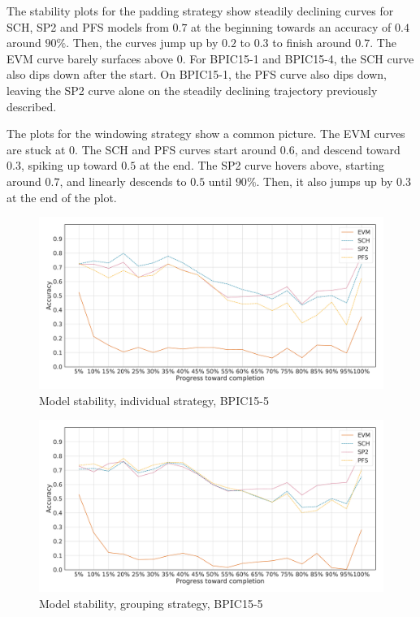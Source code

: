 The stability plots for the padding strategy show steadily declining curves for SCH, SP2 and PFS models from $0.7$ at the beginning towards an accuracy of $0.4$ around $90\%$.
Then, the curves jump up by $0.2$ to $0.3$ to finish around $0.7$.
The EVM curve barely surfaces above $0$.
For BPIC15-1 and BPIC15-4, the SCH curve also dips down after the start.
On BPIC15-1, the PFS curve also dips down, leaving the SP2 curve alone on the steadily declining trajectory previously described.

The plots for the windowing strategy show a common picture.
The EVM curves are stuck at 0.
The SCH and PFS curves start around $0.6$, and descend toward $0.3$, spiking up toward $0.5$ at the end.
The SP2 curve hovers above, starting around $0.7$, and linearly descends to $0.5$ until $90\%$.
Then, it also jumps up by $0.3$ at the end of the plot.

\begin{figure}[!htb]
    \centering
    \includegraphics[width=\textwidth]{gfx/bpic2015_5/individual_stability.pdf}
    \caption{Model stability, individual strategy, BPIC15-5}
    \label{fig:bpic15-5-individual-stability}
\end{figure}
\begin{figure}[!htb]
    \centering
    \includegraphics[width=\textwidth]{gfx/bpic2015_5/grouped_stability.pdf}
    \caption{Model stability, grouping strategy, BPIC15-5}
    \label{fig:bpic15-5-grouped-stability}
\end{figure}


